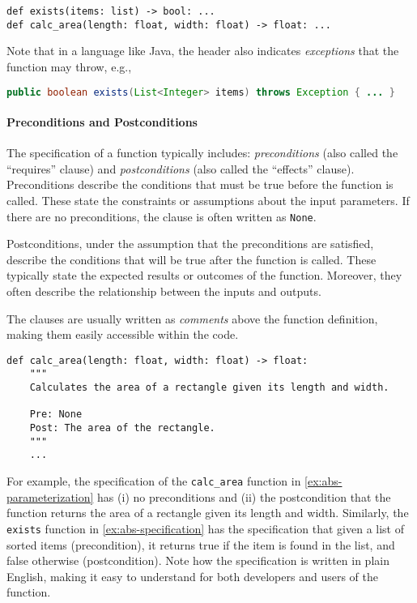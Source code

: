 \documentclass[oneside,11pt,dvipsnames]{book}
\newcommand{\code}[1]{\texttt{#1}}
\begin{document}
\begin{lstlisting}
def exists(items: list) -> bool: ...
def calc_area(length: float, width: float) -> float: ...
\end{lstlisting}

Note that in a language like Java, the header also indicates \emph{exceptions} that the function may throw, e.g., 

\begin{lstlisting}[language=Java]
public boolean exists(List<Integer> items) throws Exception { ... }
\end{lstlisting}

\paragraph{Preconditions and Postconditions}

The specification of a function typically includes: \emph{preconditions} (also called the ``requires'' clause) and \emph{postconditions} (also called the ``effects'' clause). Preconditions describe the conditions that must be true before the function is called. These state the constraints or assumptions about the input parameters. If there are no preconditions, the clause is often written as \code{None}.

Postconditions, under the assumption that the preconditions are satisfied, describe the conditions that will be true after the function is called. These typically state the expected results or outcomes of the function. Moreover, they often describe the relationship between the inputs and outputs.


The clauses are usually written as \emph{comments} above the function definition, making them easily accessible within the code.


\begin{lstlisting}
def calc_area(length: float, width: float) -> float:
    """
    Calculates the area of a rectangle given its length and width.

    Pre: None
    Post: The area of the rectangle.
    """
    ...
\end{lstlisting}

For example, the specification of the \code{calc\_area} function in \autoref{ex:abs-parameterization} has (i) no preconditions and (ii) the postcondition that the function returns the area of a rectangle given its length and width.  Similarly, the \code{exists} function in \autoref{ex:abs-specification} has the specification that given a list of sorted items (precondition), it returns true if the item is found in the list, and false otherwise (postcondition).  Note how the specification is written in plain English, making it easy to understand for both developers and users of the function.
\end{document}
